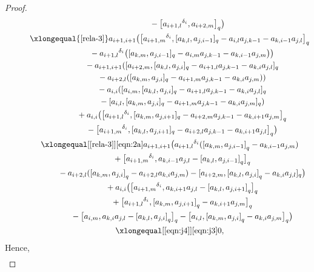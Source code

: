 \documentclass[pdftex]{sigma}
\numberwithin{equation}{section}
\def\lr#1{\left[#1\right]}
\def\d{\delta}
\begin{document}
\begin{proof}
\begin{gather*}
\quad\qquad\qquad\qquad\ {}- \bigl[{a_{i+1,l}}^{\d_i},a_{i+2,m} \bigr]_q \bigr)\\
\quad\qquad \xlongequal{\eqref{rela-3}} a_{i+1,i+1} \bigl( \bigl[{a_{i+1,m}}^{\d_i}, [a_{k,l},a_{j,i-1} ]_q -a_{i,l}a_{j,k-1}-a_{k,i-1}a_{j,l} \bigr]_q \\
\quad\qquad\qquad \quad {}-{a_{i+1,l}}^{\d_i} \bigl( [a_{k,m},a_{j,i-1} ]_q-a_{i,m}a_{j,k-1} -a_{k,i-1}a_{j,m} \bigr) \bigr)\\
 \quad\qquad\qquad \quad {}-a_{i+1,i+1} ( [a_{i+2,m}, [a_{k,l},a_{j,i} ]_q-a_{i+1,l}a_{j,k-1} -a_{k,i}a_{j,l} ]_q \\
 \quad\qquad\qquad\quad {}-a_{i+2,l} ( [a_{k,m},a_{j,i} ]_q-a_{i+1,m}a_{j,k-1} -a_{k,i}a_{j,m} ) )\\
 \quad\qquad\qquad\quad {}-a_{i,i} ( [a_{i,m}, [a_{k,l},a_{j,i} ]_q -a_{i+1,l}a_{j,k-1}-a_{k,i}a_{j,l} ]_q \\
\quad\qquad\qquad \quad {}- [a_{i,l}, [a_{k,m},a_{j,i} ]_q-a_{i+1,m}a_{j,k-1} -a_{k,i}a_{j,m} ]_q )\\
\quad\qquad\qquad\quad {}+a_{i,i} \bigl( \bigl[{a_{i+1,l}}^{\d_i}, [a_{k,m},a_{j,i+1} ]_q -a_{i+2,m}a_{j,k-1}-a_{k,i+1}a_{j,m} \bigr]_q \\
\quad\qquad\qquad \quad {}- \bigl[{a_{i+1,m}}^{\d_i}, [a_{k,l},a_{j,i+1} ]_q -a_{i+2,l}a_{j,k-1}-a_{k,i+1}a_{j,l} \bigr]_q \bigr)\\
\quad\qquad \xlongequal[\eqref{rela-3}]{\eqref{eqn:2a}} a_{i+1,i+1} \bigl({a_{i+1,l}}^{\d_i} (\lr{a_{k,m},a_{j,i-1}}_q-a_{k,i-1}a_{j,m}) \\
 \quad\qquad\qquad \quad {}+\bigl[{a_{i+1,m}}^{\d_i}, a_{k,i-1}a_{j,l}-\lr{a_{k,l},a_{j,i-1}}_q\bigr]_q \\
 \quad\qquad\qquad \quad {}-a_{i+2,l}(\lr{a_{k,m}, a_{j,i}}_q -a_{i+2,l}a_{k,i}a_{j,m})-[a_{i+2,m}, \lr{a_{k,l},a_{j,i}}_q-a_{k,i}a_{j,l}]_q \bigr)\\
 \quad\qquad\qquad \quad {}+a_{i,i} \bigl(\bigl[{a_{i+1,m}}^{\d_i},a_{k,i+1}a_{j,l}-\lr{a_{k,l},a_{j,i+1}}_q\bigr]_q \\
 \quad\qquad\qquad \quad {}+\bigl[{a_{i+1,l}}^{\d_i},\lr{a_{k,m},a_{j,i+1}}_q-a_{k,i+1}a_{j,m}\bigr]_q \\
 \quad\qquad\qquad \quad {}-\bigl[a_{i,m},a_{k,i}a_{j,l} -\lr{a_{k,l},a_{j,i}}_q\bigr]_q -\bigl[a_{i,l},\lr{a_{k,m},a_{j,i}}_q-a_{k,i}a_{j,m}\bigr]_q \bigr)\\
\quad\qquad \xlongequal[\eqref{eqn:j4}]{\eqref{eqn:j3}} 0,
\end{gather*}
Hence,
\begin{gather*}

\end{gather*}
\end{proof}
\end{document}
